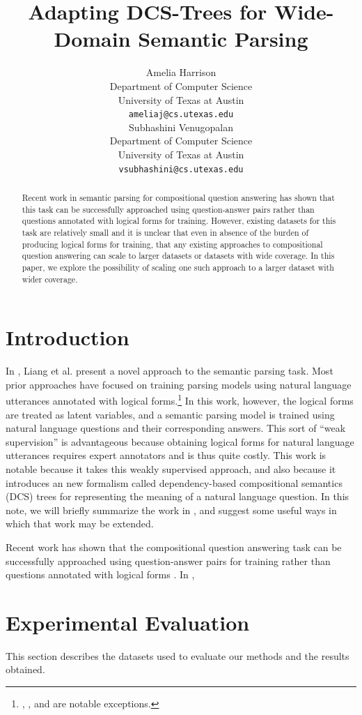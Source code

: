 \documentclass[11pt]{article}
\title{Adapting DCS-Trees for Wide-Domain Semantic Parsing}
\author{Amelia Harrison \\
  Department of Computer Science\\
  University of Texas at Austin \\
  {\tt ameliaj@cs.utexas.edu} \\\And
  Subhashini Venugopalan \\
  Department of Computer Science\\
  University of Texas at Austin \\
  {\tt vsubhashini@cs.utexas.edu} \\}
\date{}
\begin{document}
\maketitle
\begin{abstract}
   Recent work in semantic parsing for compositional question answering has shown
that this task can be successfully approached using question-answer pairs rather
than questions annotated with logical forms for training. However, existing
datasets for this task are relatively small and it is unclear that even in
absence of the burden of producing logical forms for training, that any existing
approaches to compositional question answering can scale to larger datasets or
datasets with wide coverage.  In this paper, we explore the possibility of scaling 
one such approach to a larger dataset with wider coverage. 

\end{abstract}

\section{Introduction}

In \cite{LJK11}, Liang et al. present a novel approach to the semantic parsing
task. Most prior approaches have focused on training parsing models using natural
language utterances annotated with logical forms.\footnote{\cite{CGCR10}, 
\cite{CGRR11}, and \cite{PD09} are notable exceptions.} In this work, however,
the logical forms are treated as latent variables, and a semantic parsing model
is trained using natural language questions and their corresponding answers. 
This sort of ``weak supervision'' is advantageous because obtaining 
logical forms for natural language utterances requires expert annotators and is
thus quite costly. This work is notable because it takes this weakly supervised 
approach, and also because it introduces an new formalism called
dependency-based compositional semantics (DCS) trees for representing 
the meaning of a natural language question. In this note, we will briefly
summarize the work in \cite{LJK11}, and suggest some useful ways in which that work
may be extended. 

Recent work has shown that the compositional question answering
task can be successfully approached using question-answer pairs for training
rather than questions annotated with logical forms \cite{LJK11} \cite{}. In
\cite{LJK11},   

\section{Experimental Evaluation}
This section describes the datasets used to evaluate our methods and the results obtained.
\end{document}
